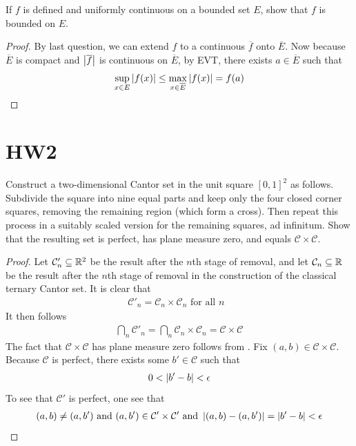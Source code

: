 \documentclass{report}
\begin{document}
\begin{question}{}{}
If $f$ is defined and uniformly continuous on a bounded set $E$, show that $f$ is bounded on $E$.
\end{question}
\begin{proof}
By last question, we can extend $f$ to a continuous $\overline{f}$ onto $\overline{E}$. Now because $\overline{E}$ is compact and $\left|\overline{f}\right|$ is continuous on $\overline{E}$, by EVT, there exists  $a\in \overline{E}$ such that 
\begin{align*}
\sup_{x\in E}\left|f(x)\right|\leq \max_{x\in \overline{E}}\left|f(x)\right|=f(a)
\end{align*}
\end{proof}
\section{HW2}
\begin{question}{}{}
Construct a two-dimensional Cantor set in the unit square $[0,1]^2$ as follows. Subdivide the square into nine equal parts and keep only the four closed corner squares, removing the remaining region (which form a cross). Then repeat this process in a suitably scaled version for the remaining squares, ad infinitum. Show that the resulting set is perfect, has plane measure zero, and equals $\mathcal{C}\times \mathcal{C}$. 
\end{question}
\begin{proof}
Let $\mathcal{C}'_n \subseteq \mathbb{R}^2$ be the result after the $n$th stage of removal, and let $\mathcal{C}_n \subseteq \mathbb{R}$ be the result after the $n$th stage of removal in the construction of the classical ternary Cantor set. It is clear that 
\begin{align*}
\mathcal{C}'_n= \mathcal{C}_n \times \mathcal{C}_n\text{ for all $n$ }
\end{align*}
It then follows 
\begin{align*}
\bigcap_n \mathcal{C}'_n= \bigcap_n \mathcal{C}_n \times \mathcal{C}_n = \mathcal{C}\times \mathcal{C}
\end{align*}
The fact that $\mathcal{C}\times \mathcal{C}$ has plane measure zero follows from . Fix  $(a,b)\in \mathcal{C}\times \mathcal{C}$. Because $\mathcal{C}$ is perfect, there exists some $b'\in \mathcal{C}$ such that 
\begin{align*}
0<\left|b'-b\right|< \epsilon 
\end{align*}
To see that $\mathcal{C}'$ is perfect, one see that  
\begin{align*}
  (a,b)\neq (a,b')\text{ and }  (a,b')\in \mathcal{C}'\times \mathcal{C}'\text{ and }\left|(a,b)-(a,b')\right|=\left|b'-b\right|<\epsilon 
\end{align*}

\end{proof}
\end{document}
